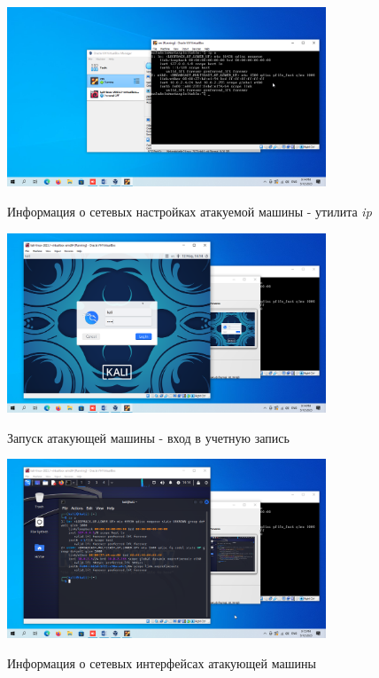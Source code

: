 \documentclass[a4paper]{article}
\begin{document}
  \begin{figure}[H]
    \centering
    \includegraphics[width=0.85\textwidth]{04_0033}
    \label{img:13}
    \caption{Информация о сетевых настройках атакуемой машины - утилита \textit{ip}}
  \end{figure}
  \begin{figure}[H]
    \centering
    \includegraphics[width=0.85\textwidth]{04_0034}
    \label{img:34}
    \caption{Запуск атакующей машины - вход в учетную запись}
  \end{figure}

  \begin{figure}[H]
    \centering
    \includegraphics[width=0.85\textwidth]{04_0036}
    \label{img:36}
    \caption{Информация о сетевых интерфейсах атакующей машины}
  \end{figure}
\end{document}
